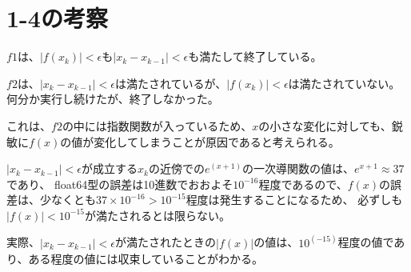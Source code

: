\section{1-4の考察}

$f1$は、$|f(x_{k})| \lt \epsilon$も$|x_{k} - x_{k-1}| \lt \epsilon$も満たして終了している。

$f2$は、$|x_{k} - x_{k-1}| \lt \epsilon$は満たされているが、$|f(x_{k})| \lt \epsilon$は満たされていない。何分か実行し続けたが、終了しなかった。

これは、$f2$の中には指数関数が入っているため、$x$の小さな変化に対しても、鋭敏に$f(x)$の値が変化してしまうことが原因であると考えられる。

$|x_{k} - x_{k-1}| \lt \epsilon$が成立する$x_{k}$の近傍での$e^{(x+1)}$の一次導関数の値は、$e^{x+1} \approx 37 $であり、
float64型の誤差は10進数でおおよそ$10^{-16}$程度であるので、$f(x)$の誤差は、少なくとも$37 \times 10^{-16} \gt 10^{-15}$程度は発生することになるため、
必ずしも$|f(x)| \lt 10^{-15}$が満たされるとは限らない。

実際、$|x_{k} - x_{k-1}| \lt \epsilon$が満たされたときの$|f(x)|$の値は、$10^(-15)$程度の値であり、ある程度の値には収束していることがわかる。
